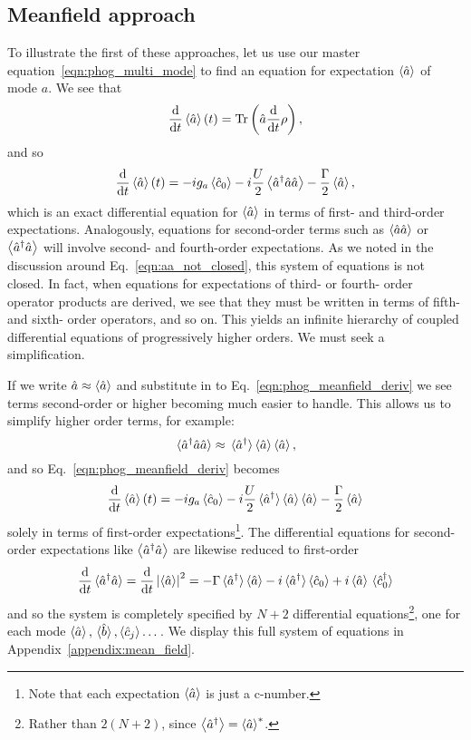 \subsection{Meanfield approach}\label{sec:meanfield}
To illustrate the first of these approaches, let us use our master equation~\ref{eqn:phog_multi_mode} to find an equation for expectation $\ev{\hat{a}}$ of mode $a$. We see that
\begin{equation}
\ddt \ev{\hat{a}}\left(t\right) = \text{Tr}\left( \hat{a} \ddt \rho\right),
\end{equation}
and so
\begin{equation}\label{eqn:phog_meanfield_deriv}
\ddt \ev{\hat{a}}\left(t\right) = - i g_a \ev{\hat{c}_0} - i \frac{U}{2} \ev{\hat{a}^\dagger \hat{a}\hat{a}} - \frac{\Gamma}{2} \ev{\hat{a}},
\end{equation}
which is an exact differential equation for $\ev{\hat{a}}$ in terms of first- and third-order expectations. Analogously, equations for second-order terms such as $\ev{\hat{a}\hat{a}}$ or $\ev{\hat{a}^\dagger \hat{a}}$ will involve second- and fourth-order expectations. As we noted in the discussion around Eq.~\ref{eqn:aa_not_closed}, this system of equations is not closed. In fact, when equations for expectations of third- or fourth- order operator products are derived, we see that they must be written in terms of fifth- and sixth- order operators, and so on. This yields an infinite hierarchy of coupled differential equations of progressively higher orders. We must seek a simplification.

If we write $\hat{a} \approx \ev{\hat{a}}$ and substitute in to Eq.~\ref{eqn:phog_meanfield_deriv} we see terms second-order or higher becoming much easier to handle. This allows us to simplify higher order terms, for example:
\begin{equation}
\ev*{\hat{a}^\dagger \hat{a} \hat{a}} \approx \ev*{\hat{a}^\dagger} \ev{\hat{a}} \ev{\hat{a}},
\end{equation}
and so Eq.~\ref{eqn:phog_meanfield_deriv} becomes
\begin{equation}\label{eqn:phog_meanfield_deriv_1}
\ddt \ev{\hat{a}}\left(t\right) = - i g_a \ev{\hat{c}_0} - i \frac{U}{2} \ev*{\hat{a}^\dagger} \ev{\hat{a}} \ev{\hat{a}} - \frac{\Gamma}{2} \ev{\hat{a}}
\end{equation}
solely in terms of first-order expectations\footnote{Note that each expectation $\ev{\hat{a}}$ is just a c-number.}. The differential equations for second-order expectations like $\ev{\hat{a}^\dagger \hat{a}}$ are likewise reduced to first-order
\begin{equation}
\ddt \ev*{\hat{a}^\dagger \hat{a}} = \ddt \left|\ev{\hat{a}}\right|^2 =  - \Gamma \ev*{\hat{a}^\dagger}\ev{\hat{a}} - i \ev*{\hat{a}^\dagger}\ev{\hat{c}_0} + i \ev{\hat{a}}\ev*{\hat{c}_0^\dagger}
\end{equation}
and so the system is completely specified by $N+2$ differential equations\footnote{Rather than $2(N+2)$, since $\ev{\hat{a}^\dagger} = \ev{\hat{a}}^*$.}, one for each mode $\ev{\hat{a}}, \ev*{\hat{b}}, \ev{\hat{c}_j} \dots$. We display this full system of equations in Appendix~\ref{appendix:mean_field}. 


